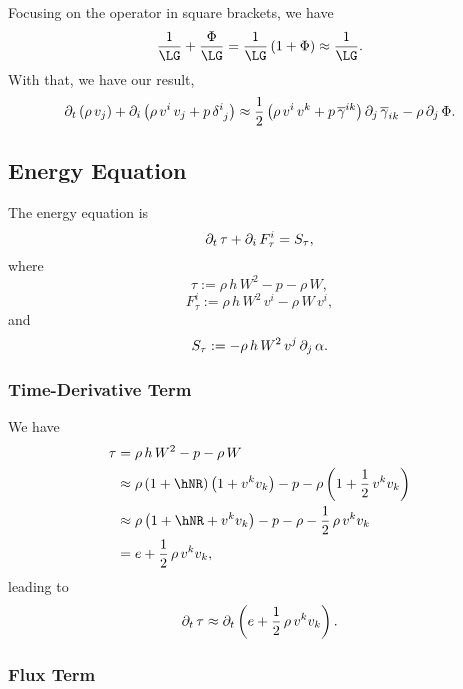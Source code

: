 Focusing on the operator in square brackets, we have
\begin{equation}
  \frac{1}{\LG}+\frac{\Phi}{\LG}
  =\frac{1}{\LG}\left(1+\Phi\right)
  \approx\frac{1}{\LG}.
\end{equation}
With that, we have our result,
\begin{equation}
  \partial_{t}\left(\rho\,v_{j}\right)
  +\partial_{i}\left(\rho\,v^{i}\,v_{j}+p\,\delta^{i}_{~j}\right)
  \approx\frac{1}{2}\left(\rho\,v^{i}\,v^{k}+p\,\overline{\gamma}^{ik}\right)
  \partial_{j}\,\overline{\gamma}_{ik}-\rho\,\partial_{j}\,\Phi.
\end{equation}

\subsection{Energy Equation}

The energy equation is
\begin{equation}
  \partial_{t}\,\tau+\partial_{i}\,F^{i}_{\tau}=S_{\tau},
\end{equation}
where
\begin{equation}
  \tau:=\rho\,h\,W^{2}-p-\rho\,W,
\end{equation}
\begin{equation}
  F^{i}_{\tau}:=\rho\,h\,W^{2}\,v^{i}-\rho\,W\,v^{i},
\end{equation}
and
\begin{equation}
  S_{\tau}:=-\rho\,h\,W^{2}\,v^{j}\,\partial_{j}\,\alpha.
\end{equation}

\subsubsection{Time-Derivative Term}

We have
\begin{align}
  \tau&=\rho\,h\,W^{2}-p-\rho\,W \\
  &\approx\rho\left(1+\hNR\right)\left(1+v^{k}v_{k}\right)
  -p-\rho\left(1+\frac{1}{2}\,v^{k}v_{k}\right) \\
  &\approx\rho\left(1+\hNR+v^{k}v_{k}\right)
  -p-\rho-\frac{1}{2}\,\rho\,v^{k}v_{k} \\
  &=e+\frac{1}{2}\,\rho\,v^{k}v_{k},
\end{align}
leading to
\begin{equation}
  \partial_{t}\,\tau\approx\partial_{t}\left(e+\frac{1}{2}\,\rho\,v^{k}v_{k}\right).
\end{equation}

\subsubsection{Flux Term}


